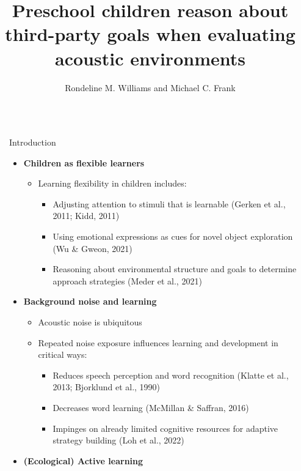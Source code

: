 \documentclass[final]{beamer}
\title{Preschool children reason about third-party goals when evaluating acoustic environments}
\author{Rondeline M. Williams and Michael C. Frank}
\institute[shortinst]{Department of Psychology, Stanford University\\Stanford, CA 94305 USA}
\newlength{\sepwidth}
\newlength{\colwidth}
\newcommand{\separatorcolumn}{\begin{column}{\sepwidth}\end{column}}
\begin{document}

\begin{frame}[t]
\begin{columns}[t]
\separatorcolumn

\begin{column}{\colwidth}

  \begin{block}{Introduction}

    \begin{itemize}
      \item \textbf{Children as flexible learners}
        \begin{itemize}
          \item Learning flexibility in children includes:
            \begin{itemize}
              \item Adjusting attention to stimuli that is learnable (Gerken et al., 2011; Kidd, 2011)
              \item Using emotional expressions as cues for novel object exploration (Wu \& Gweon, 2021)
              \item Reasoning about environmental structure and goals to determine approach strategies (Meder et al., 2021)
            \end{itemize}
        \end{itemize}
      \item \textbf{Background noise and learning}
        \begin{itemize}
          \item Acoustic noise is ubiquitous
          \item Repeated noise exposure influences learning and development in critical ways:
            \begin{itemize}
              \item Reduces speech perception and word recognition (Klatte et al., 2013; Bjorklund et al., 1990)
              \item Decreases word learning (McMillan \& Saffran, 2016)
              \item Impinges on already limited cognitive resources for adaptive strategy building (Loh et al., 2022)
            \end{itemize}
        \end{itemize}
      \item \textbf{(Ecological) Active learning}
        \begin{itemize}

\end{itemize}
\end{itemize}
\end{block}
\end{column}
\end{columns}
\end{frame}
\end{document}

